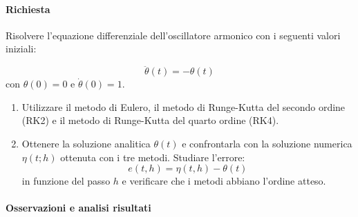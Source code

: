 \paragraph{Richiesta}

Risolvere l'equazione differenziale dell'oscillatore armonico con i seguenti valori iniziali:

\begin{equation}
	\ddot{\theta}(t) = -\theta(t)
\end{equation}
con $\theta(0) = 0$ e $\dot{\theta}(0) = 1$.

\begin{enumerate}
	\item Utilizzare il metodo di Eulero, il metodo di Runge-Kutta del secondo ordine (RK2) e il metodo di Runge-Kutta del quarto ordine (RK4).

	\item Ottenere la soluzione analitica $\theta(t)$ e confrontarla con la soluzione numerica $\eta(t;h)$ ottenuta con i tre metodi. Studiare l'errore:
	      \[
		      e(t,h) = \eta(t,h) - \theta(t)
	      \]
	      in funzione del passo $h$ e verificare che i metodi abbiano l'ordine atteso.

\end{enumerate}

\paragraph{Osservazioni e analisi risultati}

